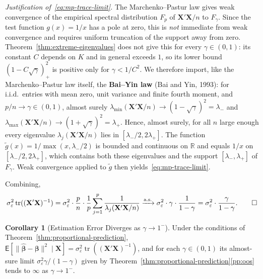 \documentclass[12pt,a4paper]{article}
\makeatletter
\theoremstyle{definition}
\newtheorem{corollary}[theorem]{Corollary}
\renewenvironment{proof}[1][\proofname]{\par
  \pushQED{\qed}%
  \normalfont \topsep6\p@\@plus6\p@\relax
  \trivlist
  \item[\hskip\labelsep\bfseries #1\@addpunct{.}]\ignorespaces
}{%
  \popQED\endtrivlist\@endpefalse
}
\newcommand\expc{\mathsf{E}}
\DeclareMathOperator\tr{tr}
\newcommand{\bX}{\mathbf{X}}
\def\bb{\boldsymbol{\beta}}
\newcommand{\Real}{\mathbb{R}}
\newcommand{\hbb}{\hat{\boldsymbol{\beta}}}
\makeatother
\begin{document}
\begin{proof}
\medskip\noindent\emph{Justification of~\eqref{eq:mp-trace-limit}.} The Marchenko--Pastur law gives weak convergence of the empirical spectral distribution $F_p$ of $\bX'\bX/n$ to $F_\gamma$. Since the test function $g(x) = 1/x$ has a pole at zero, this is \emph{not} immediate from weak convergence and requires uniform truncation of the support away from zero. Theorem~\ref{thm:extreme-eigenvalues} does not give this for every $\gamma \in (0,1)$: its constant $C$ depends on $K$ and in general exceeds $1$, so its lower bound $(1 - C\sqrt\gamma)_+^2$ is positive only for $\gamma < 1/C^2$. We therefore import, like the Marchenko--Pastur law itself, the \textbf{Bai--Yin law} (Bai and Yin, 1993): for i.i.d.\ entries with mean zero, unit variance and finite fourth moment, and $p/n \to \gamma \in (0,1)$, almost surely $\lambda_{\min}(\bX'\bX/n) \to (1 - \sqrt\gamma)^2 = \lambda_-$ and $\lambda_{\max}(\bX'\bX/n) \to (1 + \sqrt\gamma)^2 = \lambda_+$. Hence, almost surely, for all $n$ large enough every eigenvalue $\lambda_j(\bX'\bX/n)$ lies in $[\lambda_-/2, 2\lambda_+]$. The function $\tilde g(x) = 1/\max(x, \lambda_-/2)$ is bounded and continuous on $\Real$ and equals $1/x$ on $[\lambda_-/2, 2\lambda_+]$, which contains both these eigenvalues and the support $[\lambda_-, \lambda_+]$ of $F_\gamma$. Weak convergence applied to $\tilde g$ then yields~\eqref{eq:mp-trace-limit}.

\medskip\noindent Combining,
\[
\sigma_\varepsilon^2\tr((\bX'\bX)^{-1}) = \sigma_\varepsilon^2 \cdot \frac{p}{n}\cdot\frac{1}{p}\sum_{j=1}^p\frac{1}{\lambda_j(\bX'\bX/n)} \xrightarrow{\text{a.s.}} \sigma_\varepsilon^2\cdot\gamma\cdot\frac{1}{1-\gamma} = \sigma_\varepsilon^2\cdot\frac{\gamma}{1-\gamma}. \qedhere
\]
\end{proof}

\begin{corollary}[Estimation Error Diverges as $\gamma \to 1^-$]\label{cor:estimation-diverges}
Under the conditions of Theorem~\ref{thm:proportional-prediction}, $\expc[\|\hbb - \bb\|^2 \mid \bX] = \sigma_\varepsilon^2\tr((\bX'\bX)^{-1})$, and for each $\gamma \in (0,1)$ its almost-sure limit $\sigma_\varepsilon^2\gamma/(1-\gamma)$ given by Theorem~\ref{thm:proportional-prediction}\ref{pp:oos} tends to $\infty$ as $\gamma \to 1^-$.
\end{corollary}
\end{document}
